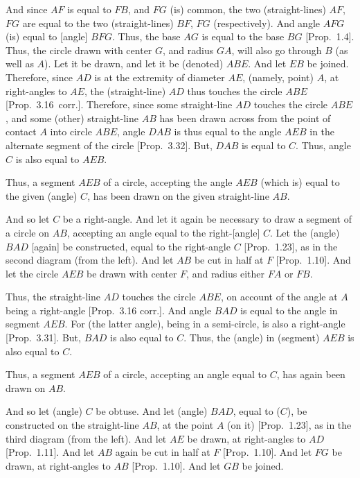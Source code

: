 \begin{Parallel}{}{}
{And since $AF$ is equal to $FB$, and $FG$ (is) common, the two (straight-lines)
$AF$, $FG$ are equal to the two (straight-lines) $BF$, $FG$ (respectively). And
angle $AFG$ (is) equal to [angle] $BFG$. Thus, the base $AG$ is equal to the
base $BG$ [Prop.~1.4]. Thus, the circle drawn with center $G$, and radius $GA$, will also go through $B$ (as well as $A$). Let it be drawn, and let it be (denoted) $ABE$. And let $EB$ be joined. Therefore, since $AD$ is at the extremity
of diameter $AE$,  (namely, point) $A$,  at right-angles to $AE$, the (straight-line)
$AD$ thus touches the circle $ABE$ [Prop.~3.16~corr.]. Therefore,
since some straight-line $AD$ touches the circle $ABE$, and some (other)
straight-line $AB$ has been drawn across from the point of contact $A$ into circle
$ABE$, angle $DAB$ is thus equal to the angle $AEB$ in the alternate segment of the
circle [Prop.~3.32]. But, $DAB$ is equal to $C$. Thus,
angle $C$ is also equal to $AEB$.

Thus, a segment $AEB$ of a circle, accepting the angle $AEB$ (which is) equal to the
given (angle) $C$, has been drawn on the given straight-line $AB$.

And so let $C$ be a right-angle. And let it again be necessary to draw  a segment
of a circle on $AB$, accepting an angle equal to the right-[angle] $C$. Let the (angle)
$BAD$ [again] be constructed, equal to the right-angle $C$ [Prop.~1.23], as in the second diagram (from the left). And let $AB$ be cut in half at $F$ [Prop.~1.10]. And let the circle $AEB$ be
drawn with center $F$, and radius either  $FA$ or $FB$.

Thus, the straight-line $AD$ touches the circle $ABE$, on account of the angle at $A$ being a right-angle [Prop.~3.16 corr.]. And angle $BAD$ is equal
to the angle in segment $AEB$. For (the latter angle), being in a semi-circle, is also a right-angle [Prop.~3.31]. But,  $BAD$ is also equal to $C$. Thus, the (angle) in (segment) $AEB$ is also equal to $C$.

Thus, a segment $AEB$ of a circle, accepting an angle equal to $C$, has again been
drawn on $AB$.

And so let (angle) $C$ be obtuse. And let (angle) $BAD$, equal
to ($C$), be constructed  on the straight-line $AB$, at the point $A$ 
(on it) [Prop.~1.23], as in the third diagram (from the left). And let $AE$ be
drawn, at right-angles to $AD$ [Prop.~1.11]. And let $AB$ again be 
cut in half at $F$ [Prop.~1.10]. And let $FG$ be drawn,
at right-angles to $AB$ [Prop.~1.10]. And let $GB$ 
be joined.

}
\end{Parallel}
